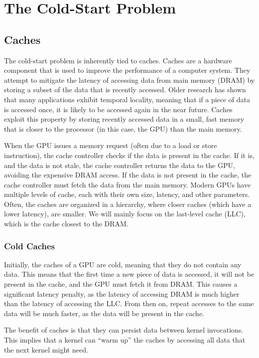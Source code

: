 \chapter{The Cold-Start Problem}\label{ch:the-cold-start-problem}
\section{Caches}\label{sec:caches}
The cold-start problem is inherently tied to caches.
Caches are a hardware component that is used to improve the performance of a computer system.
They attempt to mitigate the latency of accessing data from main memory (DRAM) by storing a subset of the data that is recently accessed.
Older research has shown that many applications exhibit temporal locality, meaning that if a piece of data is accessed once, it is likely to be accessed again in the near future.
Caches exploit this property by storing recently accessed data in a small, fast memory that is closer to the processor (in this case, the GPU) than the main memory.

When the GPU issues a memory request (often due to a load or store instruction), the cache controller checks if the data is present in the cache.
If it is, and the data is not stale, the cache controller returns the data to the GPU, avoiding the expensive DRAM access.
If the data is not present in the cache, the cache controller must fetch the data from the main memory.
Modern GPUs have multiple levels of cache, each with their own size, latency, and other parameters.
Often, the caches are organized in a hierarchy, where closer caches (which have a lower latency), are smaller.
We will mainly focus on the last-level cache (LLC), which is the cache closest to the DRAM\@.

\subsection{Cold Caches}\label{subsec:cold-caches}
Initially, the caches of a GPU are cold, meaning that they do not contain any data.
This means that the first time a new piece of data is accessed, it will not be present in the cache, and the GPU must fetch it from DRAM\@.
This causes a significant latency penalty, as the latency of accessing DRAM is much higher than the latency of accessing the LLC\@.
From then on, repeat accesses to the same data will be much faster, as the data will be present in the cache.

The benefit of caches is that they can persist data between kernel invocations.
This implies that a kernel can ``warm up'' the caches by accessing all data that the next kernel might need.

